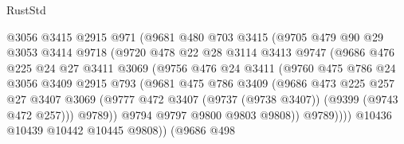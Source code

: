 \begin{lexlean}{RustStd}
\begin{coremodule}
                      @3056
                      @3415
                      @2915
                      @971
                      (@9681
                        @480
                        @703
                        @3415
                        (@9705
                          @479
                          @90
                          @29
                          @3053
                          @3414
                          @9718
                          (@9720
                            @478
                            @22
                            @28
                            @3114
                            @3413
                            @9747
                            (@9686
                              @476
                              @225
                              @24
                              @27
                              @3411
                              @3069
                              (@9756
                                @476
                                @24
                                @3411
                                (@9760
                                  @475
                                  @786
                                  @24
                                  @3056
                                  @3409
                                  @2915
                                  @793
                                  (@9681
                                    @475
                                    @786
                                    @3409
                                    (@9686
                                      @473
                                      @225
                                      @257
                                      @27
                                      @3407
                                      @3069
                                      (@9777
                                        @472
                                        @3407
                                        (@9737 (@9738 @3407))
                                        (@9399 (@9743 @472 @257)))
                                      @9789))
                                  @9794
                                  @9797
                                  @9800
                                  @9803
                                  @9808))
                              @9789))))
                      @10436
                      @10439
                      @10442
                      @10445
                      @9808))
                  (@9686
                    @498

\end{coremodule}
\end{lexlean}
